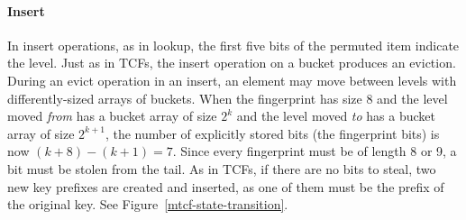 \documentclass[letterpaper,twocolumn,10pt]{article}
\newcommand{\ints}{\mathbb{Z}}
\begin{document}



\paragraph{Insert}
In insert operations, as in lookup, the first five bits of the permuted item indicate the level. %
Just as in TCFs, the insert operation on a bucket produces an eviction. %
During an evict operation in an insert, an element may move between levels with differently-sized arrays of buckets.
When the fingerprint has size 8 and the level moved {\em from} has a bucket array of size $2^k$ and the level moved {\em to} has a bucket array of size $2^{k+1}$, the number of explicitly stored bits (the fingerprint bits) is now $(k + 8) - (k+1) = 7$.
Since every fingerprint must be of length 8 or 9, a bit must be stolen from the tail. %
As in TCFs, if there are no bits to steal, two new key prefixes are created and inserted, as one of them must be the prefix of the original key. %
See Figure~\ref{mtcf-state-transition}.
\end{document}
